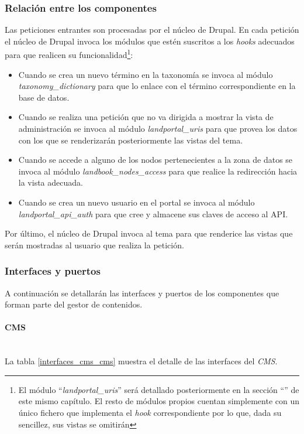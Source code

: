 \subsubsection{Relación entre los componentes}
Las peticiones entrantes son procesadas por el núcleo de Drupal.  En cada petición el núcleo de Drupal invoca los módulos que estén suscritos a los \textit{hooks} adecuados para que realicen su funcionalidad\footnote{El módulo ``\textit{landportal\_uris}'' será detallado posteriormente en la sección ``'' de este mismo capítulo.  El resto de módulos propios cuentan simplemente con un único fichero que implementa el \textit{hook} correspondiente por lo que, dada su sencillez, sus vistas se omitirán}:
\begin{itemize}
	\item Cuando se crea un nuevo término en la taxonomía se invoca al módulo \textit{taxonomy\_dictionary} para que lo enlace con el término correspondiente en la base de datos.
	\item Cuando se realiza una petición que no va dirigida a mostrar la vista de administración se invoca al módulo \textit{landportal\_uris} para que provea los datos con los que se renderizarán posteriormente las vistas del tema.
	\item Cuando se accede a alguno de los nodos pertenecientes a la zona de datos se invoca al módulo \textit{landbook\_nodes\_access} para que realice la redirección hacia la vista adecuada.
	\item Cuando se crea un nuevo usuario en el portal se invoca al módulo \textit{landportal\_api\_auth} para que cree y almacene sus claves de acceso al API.
\end{itemize}
Por último, el núcleo de Drupal invoca al tema para que renderice las vistas que serán mostradas al usuario que realiza la petición.


\subsubsection{Interfaces y puertos}
A continuación se detallarán las interfaces y puertos de los componentes que forman parte del gestor de contenidos. 

\paragraph{CMS} \hfill \\
La tabla \ref{interfaces_cms_cms} muestra el detalle de las interfaces del \textit{CMS}.

